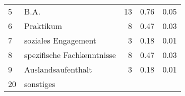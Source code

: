 \begin{longtable}{lXrrr}
     5 &
     \multicolumn{1}{X}{ B.A.   } &


       \num{13} &
       \num[round-mode=places,round-precision=2]{0.76} &
         \num[round-mode=places,round-precision=2]{0.05} \\

     6 &
     \multicolumn{1}{X}{ Praktikum   } &


       \num{8} &
       \num[round-mode=places,round-precision=2]{0.47} &
         \num[round-mode=places,round-precision=2]{0.03} \\

     7 &
     \multicolumn{1}{X}{ soziales Engagement   } &


       \num{3} &
       \num[round-mode=places,round-precision=2]{0.18} &
         \num[round-mode=places,round-precision=2]{0.01} \\

     8 &
     \multicolumn{1}{X}{ spezifische Fachkenntnisse   } &


       \num{8} &
       \num[round-mode=places,round-precision=2]{0.47} &
         \num[round-mode=places,round-precision=2]{0.03} \\

     9 &
     \multicolumn{1}{X}{ Auslandsaufenthalt   } &


       \num{3} &
       \num[round-mode=places,round-precision=2]{0.18} &
         \num[round-mode=places,round-precision=2]{0.01} \\

     20 &
     \multicolumn{1}{X}{ sonstiges   } &



\end{longtable}
